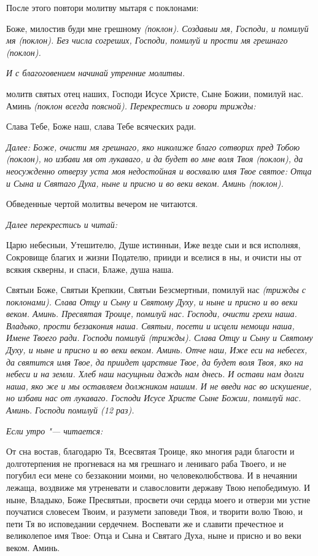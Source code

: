 После этого повтори молитву мытаря с поклонами:


Боже, милостив буди мне грешному \itshape (поклон)\normalfont{}. Создавыи мя, Господи, и помилуй мя \itshape (поклон)\normalfont{}. Без числа согреших, Господи, помилуй и прости мя грешнаго \itshape (поклон)\normalfont{}. 


\medskip\itshape И с благоговением начинай утренние молитвы.\normalfont{}


 молитв святых отец наших, Господи Исусе Христе, Сыне Божии, помилуй нас. Аминь \itshape (поклон всегда поясной). Перекрестись и говори трижды:\normalfont{}


Слава Тебе, Боже наш, слава Тебе всяческих ради. 


\medskip\itshape Далее:\normalfont{} Боже, очисти мя грешнаго, яко николиже благо сотворих пред Тобою \itshape (поклон)\normalfont{}, но избави мя от лукаваго, и да будет во мне воля Твоя \itshape (поклон)\normalfont{}, да неосужденно отверзу уста моя недостойная и восхвалю имя Твое святое: Отца и Сына и Святаго Духа, ныне и присно и во веки веком. Аминь \itshape (поклон).

 Обведенные чертой молитвы вечером не читаются.\normalfont{} 


\medskip\itshape Далее перекрестись и читай: \normalfont{}


Царю небесныи, Утешителю, Душе истинныи, Иже везде сыи и вся исполняя, Сокровище благих и жизни Подателю, прииди и вселися в ны, и очисти ны от всякия скверны, и спаси, Блаже, душа наша.


Святыи Боже, Святыи Крепкии, Святыи Безсмертныи, помилуй нас \itshape (трижды с поклонами)\normalfont{}. Слава Отцу и Сыну и Святому Духу, и ныне и присно и во веки веком. Аминь. Пресвятая Троице, помилуй нас. Господи, очисти грехи наша. Владыко, прости беззакония наша. Святыи, посети и исцели немощи наша, Имене Твоего ради. Господи помилуй (трижды). Слава Отцу и Сыну и Святому Духу, и ныне и присно и во веки веком. Аминь. Отче наш, Иже еси на небесех, да святится имя Твое, да приидет царствие Твое, да будет воля Твоя, яко на небеси и на земли. Хлеб наш насущныи даждь нам днесь. И остави нам долги наша, яко же и мы оставляем должником нашим. И не введи нас во искушение, но избави нас от лукаваго. Господи Исусе Христе Сыне Божии, помилуй нас. Аминь. Господи помилуй \itshape (12 раз)\normalfont{}. 


\medskip\itshape Если утро "--- читается: \normalfont{}


От сна востав, благодарю Тя, Всесвятая Троице, яко многия ради благости и долготерпения не прогневася на мя грешнаго и лениваго раба Твоего, и не погубил еси мене со беззаконии моими, но человеколюбствова. И в нечаянии лежаща, воздвиже мя утреневати и славословити державу Твою непобедимую. И ныне, Владыко, Боже Пресвятыи, просвети очи сердца моего и отверзи ми устне поучатися словесем Твоим, и разумети заповеди Твоя, и творити волю Твою, и пети Тя во исповедании сердечнем. Воспевати же и славити пречестное и великолепое имя Твое: Отца и Сына и Святаго Духа, ныне и присно и во веки веком. Аминь.


